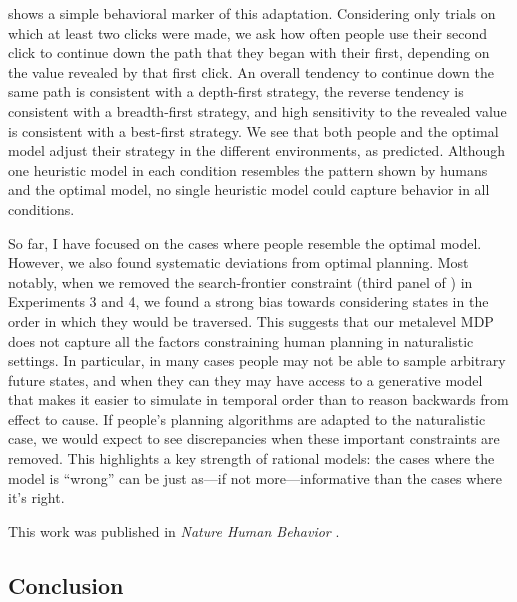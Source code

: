 \documentclass[11pt,a4paperpaper,]{article}
\begin{document}
 shows a simple behavioral marker of this adaptation. Considering only trials on which at least two clicks were made, we ask how often people use their second click to continue down the path that they began with their first, depending on the value revealed by that first click. An overall tendency to continue down the same path is consistent with a depth-first strategy, the reverse tendency is consistent with a breadth-first strategy, and high sensitivity to the revealed value is consistent with a best-first strategy. We see that both people and the optimal model adjust their strategy in the different environments, as predicted. Although one heuristic model in each condition resembles the pattern shown by humans and the optimal model, no single heuristic model could capture behavior in all conditions. 

So far, I have focused on the cases where people resemble the optimal model. However, we also found systematic deviations from optimal planning. Most notably, when we removed the search-frontier constraint (third panel of ) in Experiments 3 and 4, we found a strong bias towards considering states in the order in which they would be traversed. This suggests that our metalevel MDP does not capture all the factors constraining human planning in naturalistic settings. In particular, in many cases people may not be able to sample arbitrary future states, and when they can they may have access to a generative model that makes it easier to simulate in temporal order than to reason backwards from effect to cause. If people's planning algorithms are adapted to the naturalistic case, we would expect to see discrepancies when these important constraints are removed. This highlights a key strength of rational models: the cases where the model is ``wrong'' can be just as---if not more---informative than the cases where it's right.

This work was published in \emph{Nature Human Behavior} \citealp{callaway2022rational}.


\subsection{Conclusion}

\end{document}
